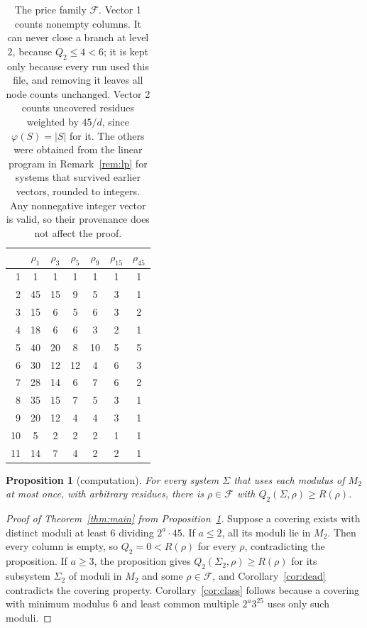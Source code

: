 \documentclass[11pt]{amsart}
\newtheorem{proposition}[theorem]{Proposition}
\theoremstyle{definition}
\theoremstyle{remark}
\begin{document}
\begin{table}[ht]
\centering
\begin{tabular}{rcccccc}
\toprule
 & $\rho_1$ & $\rho_3$ & $\rho_5$ & $\rho_9$ & $\rho_{15}$ & $\rho_{45}$\\
\midrule
1 & 1 & 1 & 1 & 1 & 1 & 1\\
2 & 45 & 15 & 9 & 5 & 3 & 1\\
3 & 15 & 6 & 5 & 6 & 3 & 2\\
4 & 18 & 6 & 6 & 3 & 2 & 1\\
5 & 40 & 20 & 8 & 10 & 5 & 5\\
6 & 30 & 12 & 12 & 4 & 6 & 3\\
7 & 28 & 14 & 6 & 7 & 6 & 2\\
8 & 35 & 15 & 7 & 5 & 3 & 1\\
9 & 20 & 12 & 4 & 4 & 3 & 1\\
10 & 5 & 2 & 2 & 2 & 1 & 1\\
11 & 14 & 7 & 4 & 2 & 2 & 1\\
\bottomrule
\end{tabular}
\caption{The price family $\mathcal F$. Vector 1 counts nonempty columns. It can never close a branch at level $2$, because $Q_2\le4<6$; it is kept only because every run used this file, and removing it leaves all node counts unchanged. Vector 2 counts uncovered residues weighted by $45/d$, since $\varphi(S)=|S|$ for it. The others were obtained from the linear program in Remark~\ref{rem:lp} for systems that survived earlier vectors, rounded to integers. Any nonnegative integer vector is valid, so their provenance does not affect the proof.}
\label{tab:prices}
\end{table}

\begin{proposition}[computation]\label{prop:comp}
For every system $\Sigma$ that uses each modulus of $M_2$ at most once, with arbitrary residues, there is $\rho\in\mathcal F$ with $Q_2(\Sigma,\rho)\ge R(\rho)$.
\end{proposition}

\begin{proof}[Proof of Theorem~\ref{thm:main} from Proposition~\ref{prop:comp}]
Suppose a covering exists with distinct moduli at least $6$ dividing $2^a\cdot45$. If $a\le 2$, all its moduli lie in $M_2$. Then every column is empty, so $Q_2=0<R(\rho)$ for every $\rho$, contradicting the proposition. If $a\ge3$, the proposition gives $Q_2(\Sigma_2,\rho)\ge R(\rho)$ for its subsystem $\Sigma_2$ of moduli in $M_2$ and some $\rho\in\mathcal F$, and Corollary~\ref{cor:dead} contradicts the covering property. Corollary~\ref{cor:class} follows because a covering with minimum modulus $6$ and least common multiple $2^a3^25$ uses only such moduli.
\end{proof}
\end{document}
